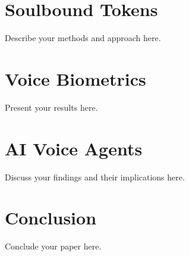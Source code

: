 \documentclass[11pt,a4paper]{article}
\begin{document}
\section{Soulbound Tokens}
\label{sec:methodology}
Describe your methods and approach here.

\section{Voice Biometrics}
\label{sec:results}
Present your results here.

\section{AI Voice Agents}
\label{sec:discussion}
Discuss your findings and their implications here.

\section{Conclusion}
\label{sec:conclusion}
Conclude your paper here.



\end{document}
